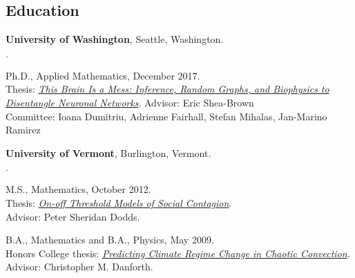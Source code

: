 \documentclass[margin,line]{res}
\newenvironment{list1}{
  \begin{list}{$\cdot$}{%
      \setlength{\itemsep}{0in}
      \setlength{\parsep}{0in} \setlength{\parskip}{0in}
      \setlength{\topsep}{0in} \setlength{\partopsep}{0in} 
      \setlength{\leftmargin}{0.17in}}}{\end{list}}
\begin{document}
\begin{resume}
  \section{\sc Education}

  {\bf University of Washington}, Seattle, Washington.
  \begin{list1}
    \item Ph.D., Applied Mathematics, December 2017. \\
      Thesis: 
      \textit{\href{http://hdl.handle.net/1773/40831}
        {This Brain Is a Mess: Inference, Random Graphs, and
          Biophysics to Disentangle Neuronal Networks}}.
      Advisor: Eric Shea-Brown\\
      Committee: Ioana Dumitriu, Adrienne Fairhall, Stefan Mihalas, 
      Jan-Marino Ramirez
  \end{list1}
  {\bf University of Vermont}, Burlington, Vermont.
  \begin{list1}
  \item M.S., Mathematics, October 2012.\\
    Thesis: 
    \textit{\href{https://arxiv.org/abs/1209.2177}
      {On-off Threshold Models of Social Contagion}}.\\
    Advisor: Peter Sheridan Dodds.%
  \item B.A., Mathematics and B.A., Physics, May 2009.\\
    Honors College thesis: 
    \textit{
      \href{https://faculty.washington.edu/kamdh/thermosyphon/thesis.pdf}
      {Predicting Climate Regime Change in Chaotic Convection}}.\\
    Advisor: Christopher M. Danforth.%
  \end{list1}



\end{resume}
\end{document}
